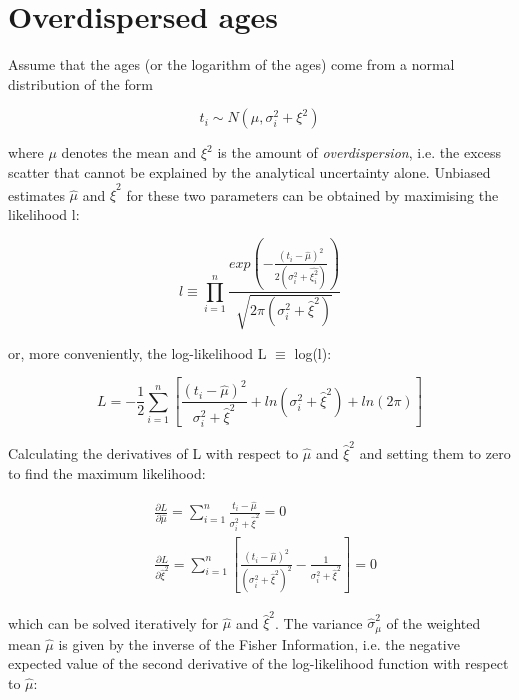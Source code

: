 \documentclass{article}
\begin{document}
\section{Overdispersed ages} \label{sec:ages}

Assume that the ages (or the logarithm of the ages) come from a normal
distribution of the form

\begin{equation}
  \label{eq:norm1}
  t_i \sim N(\mu,\sigma_i^2 + \xi^2)
\end{equation}

where $\mu$ denotes the mean and $\xi^2$ is the amount of {\it
  overdispersion}, i.e. the excess scatter that cannot be explained by
the analytical uncertainty alone. Unbiased estimates $\hat{\mu}$ and
$\hat{\xi}^2$ for these two parameters can be obtained by maximising the
likelihood l:

\begin{equation}
l \equiv \prod_{i=1}^n 
\frac{exp\left(-\frac{(t_i - \hat{\mu})^2}
{2(\sigma_i^2 + \hat{\xi^2_i})}\right)}
{\sqrt{2\pi(\sigma_i^2 + \hat{\xi}^2)}}
  \label{eq:l1}
\end{equation}

\noindent or, more conveniently, the log-likelihood L $\equiv$ log(l):

\begin{equation}
L = - \frac{1}{2} \sum_{i=1}^n 
\left[
\frac{(t_i - \hat{\mu})^2}{\sigma_i^2+\hat{\xi}^2}
+ ln(\sigma_i^2 + \hat{\xi}^2) + ln(2\pi)
\right]
  \label{eq:L1}
\end{equation}

\noindent Calculating the derivatives of L with respect to $\hat{\mu}$ and
$\hat{\xi}^2$ and setting them to zero to find the maximum likelihood:

\begin{align}
& \frac{\partial L}{\partial \hat{\mu}}  = 
\sum_{i=1}^n \frac{t_i - \hat{\mu}}{\sigma_i^2 + \hat{\xi}^2} = 0
\label{eq:Lmu1}\\
&\frac{\partial L}{\partial \hat{\xi}^2}  =
\sum_{i=1}^n \left[ \frac{(t_i-\hat{\mu})^2}{(\sigma_i^2+\hat{\xi}^2)^2}
- \frac{1}{\sigma_i^2+\hat{\xi}^2} \right] = 0 
\label{eq:Lxi1}
\end{align}

which can be solved iteratively for $\hat{\mu}$ and $\hat{\xi}^2$.  The
variance $\hat{\sigma}_{\mu}^2$ of the weighted mean $\hat{\mu}$ is given by
the inverse of the Fisher Information, i.e.  the negative expected
value of the second derivative of the log-likelihood function with respect
to $\hat{\mu}$:
\end{document}
